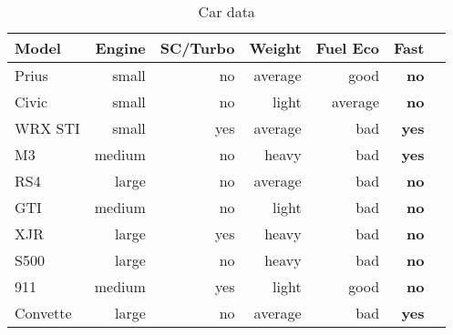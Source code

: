 \begin{table}[!htp]\centering
    \caption{Car data}\label{table:car_data}
    \scriptsize
    \begin{tabular}{lrrrrrr}\toprule
        \textbf{Model} & \textbf{Engine} & \textbf{SC/Turbo} & \textbf{Weight} & \textbf{Fuel Eco} & \textbf{Fast} \\\midrule
        Prius          & small           & no                & average         & good              & \textbf{no}   \\
        Civic          & small           & no                & light           & average           & \textbf{no}   \\
        WRX STI        & small           & yes               & average         & bad               & \textbf{yes}  \\
        M3             & medium          & no                & heavy           & bad               & \textbf{yes}  \\
        RS4            & large           & no                & average         & bad               & \textbf{no}   \\
        GTI            & medium          & no                & light           & bad               & \textbf{no}   \\
        XJR            & large           & yes               & heavy           & bad               & \textbf{no}   \\
        S500           & large           & no                & heavy           & bad               & \textbf{no}   \\
        911            & medium          & yes               & light           & good              & \textbf{no}   \\
        Convette       & large           & no                & average         & bad               & \textbf{yes}  \\

\end{tabular}
\end{table}
